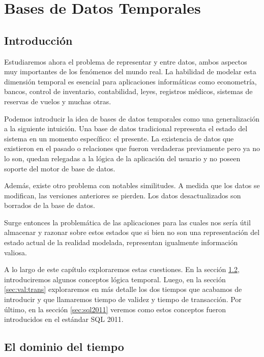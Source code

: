 \chapter{Bases de Datos Temporales}  \label{cap:t}

\section{Introducción}

Estudiaremos ahora el problema de representar  y  entre datos,
ambos aspectos muy importantes de los fenómenos del mundo real.
La habilidad de modelar esta dimensión temporal es esencial para aplicaciones informáticas como
econometría, bancos, control de inventario, contabilidad, leyes, registros médicos, sistemas de reservas de vuelos y muchas otras.

Podemos introducir la idea de bases de datos temporales como una generalización a la siguiente intuición.
Una base de datos tradicional representa el estado del sistema en un momento específico: el presente.
La existencia de datos que existieron en el pasado o relaciones que fueron verdaderas previamente pero ya no lo son,
quedan relegadas a la lógica de la aplicación del usuario y no poseen soporte del motor de base de datos.

Además, existe otro problema con notables similitudes. A medida que los datos se modifican, las versiones anteriores se pierden.
Los datos desactualizados son borrados de la base de datos.

Surge entonces la problemática de las aplicaciones para las cuales nos sería útil almacenar y razonar sobre estos estados que
si bien no son una representación del estado actual de la realidad modelada, representan igualmente información valiosa.

A lo largo de este capítulo exploraremos estas cuestiones.
En la sección \ref{sec:dominio:tiempo}, introduciremos algunos conceptos lógica temporal.
Luego, en la sección \ref{sec:val:trans} exploraremos en más detalle los dos tiempos que acabamos de introducir
y que llamaremos tiempo de validez y tiempo de transacción.
Por último, en la sección \ref{sec:sql2011} veremos como estos conceptos fueron introducidos en el estándar SQL 2011.

\section{El dominio del tiempo}\label{sec:dominio:tiempo}


